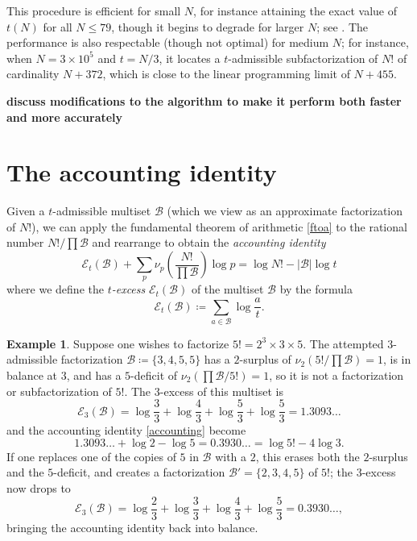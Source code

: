 \documentclass[12pt,a4paper,reqno]{amsart}
\numberwithin{equation}{section}
\theoremstyle{plain}
\theoremstyle{definition}
\newtheorem{example}[theorem]{Example}
\newcommand\tuple{{\mathcal B}}
\newcommand\excess{{\mathcal{E}}}
\begin{document}
This procedure is efficient for small $N$, for instance attaining the exact value of $t(N)$ for all $N \leq 79$, though it begins to degrade for larger $N$; see .  The performance is also respectable (though not optimal) for medium $N$; for instance, when $N=3 \times 10^5$ and $t=N/3$, it locates a $t$-admissible subfactorization of $N!$ of cardinality $N+372$, which is close to the linear programming limit of $N+455$.

{\bf discuss modifications to the algorithm to make it perform both faster and more accurately}

\section{The accounting identity}\label{accounting-sec}

Given a $t$-admissible multiset $\tuple$ (which we view as an approximate factorization of $N!$), we can apply the fundamental theorem of arithmetic \eqref{ftoa} to the rational number  $N!/\prod \tuple$ and rearrange to obtain the \emph{accounting identity}
\begin{equation}\label{accounting} 
  \excess_t(\tuple) + \sum_p \nu_p\left( \frac{N!}{\prod \tuple} \right) \log p = \log N! - |\tuple| \log t
\end{equation}
where we define the \emph{$t$-excess} $\excess_t(\tuple)$ of the multiset $\tuple$ by the formula
\begin{equation}\label{excess-def}
  \excess_t(\tuple) \coloneqq \sum_{a \in \tuple} \log \frac{a}{t}.
\end{equation}

\begin{example} Suppose one wishes to factorize $5! = 2^3 \times 3 \times 5$.  The attempted $3$-admissible factorization $\tuple \coloneqq \{3,4,5,5\}$ has a $2$-surplus of $\nu_2(5!/\prod \tuple) = 1$, is in balance at $3$, and has a $5$-deficit of $\nu_2(\prod \tuple/5!) = 1$, so it is not a factorization or subfactorization of $5!$.  The $3$-excess of this multiset is
  $$ \excess_3(\tuple) = \log \frac{3}{3} + \log \frac{4}{3} + \log \frac{5}{3} + \log \frac{5}{3} = 1.3093\dots$$
  and the accounting identity \eqref{accounting} become
  $$ 1.3093\dots + \log 2 - \log 5 = 0.3930\dots = \log 5! - 4 \log 3.$$
  If one replaces one of the copies of $5$ in ${\mathcal B}$ with a $2$, this erases both the $2$-surplus and the $5$-deficit, and creates a factorization $\tuple' = \{2,3,4,5\}$ of $5!$; the $3$-excess now drops to
  $$ \excess_3(\tuple) = \log \frac{2}{3} + \log \frac{3}{3} + \log \frac{4}{3} + \log \frac{5}{3}  = 0.3930\dots,$$
  bringing the accounting identity back into balance.
\end{example}
  
\end{document}
